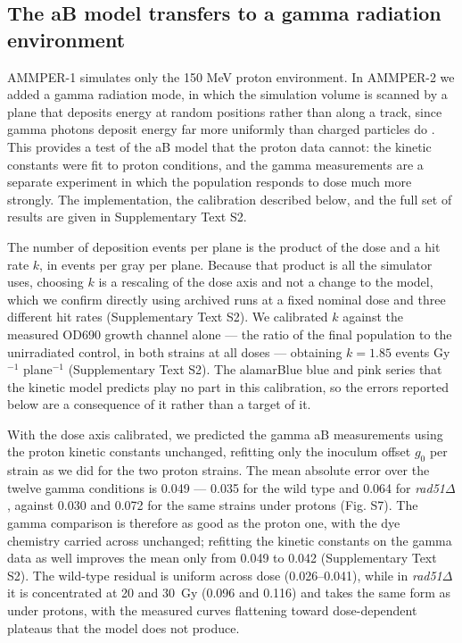 \documentclass{asmarticle}
\begin{document}
\subsection{The aB model transfers to a gamma radiation environment}

AMMPER-1 simulates only the 150 MeV proton environment. In AMMPER-2 we added a gamma radiation mode, in which the simulation volume is scanned by a plane that deposits energy at random positions rather than along a track, since gamma photons deposit energy far more uniformly than charged particles do \cite{terato2014quantitative}. This provides a test of the aB model that the proton data cannot: the kinetic constants were fit to proton conditions, and the gamma measurements are a separate experiment in which the population responds to dose much more strongly. The implementation, the calibration described below, and the full set of results are given in Supplementary Text S2.

The number of deposition events per plane is the product of the dose and a hit rate $k$, in events per gray per plane. Because that product is all the simulator uses, choosing $k$ is a rescaling of the dose axis and not a change to the model, which we confirm directly using archived runs at a fixed nominal dose and three different hit rates (Supplementary Text S2). We calibrated $k$ against the measured OD690 growth channel alone --- the ratio of the final population to the unirradiated control, in both strains at all doses --- obtaining $k = 1.85$ events Gy$^{-1}$ plane$^{-1}$ (Supplementary Text S2). The alamarBlue blue and pink series that the kinetic model predicts play no part in this calibration, so the errors reported below are a consequence of it rather than a target of it.

With the dose axis calibrated, we predicted the gamma aB measurements using the proton kinetic constants unchanged, refitting only the inoculum offset $g_0$ per strain as we did for the two proton strains. The mean absolute error over the twelve gamma conditions is 0.049 --- 0.035 for the wild type and 0.064 for \textit{rad51}$\Delta$, against 0.030 and 0.072 for the same strains under protons (Fig. S7). The gamma comparison is therefore as good as the proton one, with the dye chemistry carried across unchanged; refitting the kinetic constants on the gamma data as well improves the mean only from 0.049 to 0.042 (Supplementary Text S2). The wild-type residual is uniform across dose (0.026--0.041), while in \textit{rad51}$\Delta$ it is concentrated at 20 and 30~Gy (0.096 and 0.116) and takes the same form as under protons, with the measured curves flattening toward dose-dependent plateaus that the model does not produce.
\end{document}
